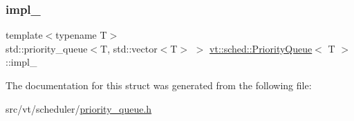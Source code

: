 \subsubsection{\texorpdfstring{impl\+\_\+}{impl\_}}
{\footnotesize\ttfamily template$<$typename T$>$ \\
std\+::priority\+\_\+queue$<$T, std\+::vector$<$T$>$ $>$ \hyperlink{structvt_1_1sched_1_1_priority_queue}{vt\+::sched\+::\+Priority\+Queue}$<$ T $>$\+::impl\+\_\+\hspace{0.3cm}{\ttfamily [private]}}



The documentation for this struct was generated from the following file\+:\begin{DoxyCompactItemize}
\item 
src/vt/scheduler/\hyperlink{priority__queue_8h}{priority\+\_\+queue.\+h}\end{DoxyCompactItemize}
